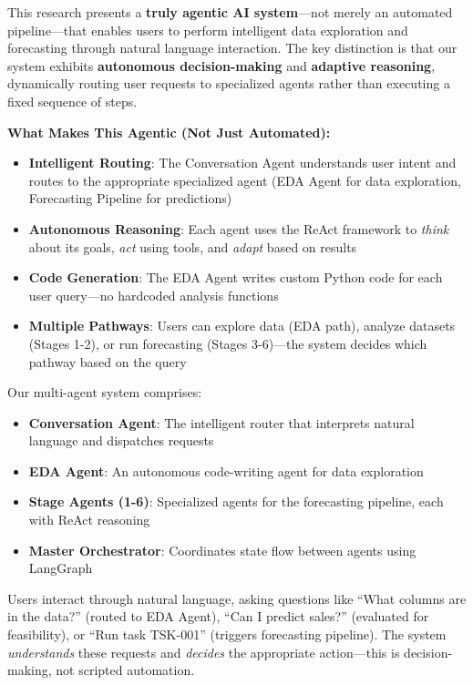\documentclass[11pt,a4paper]{article}
\begin{document}
This research presents a \textbf{truly agentic AI system}---not merely an automated pipeline---that enables users to perform intelligent data exploration and forecasting through natural language interaction. The key distinction is that our system exhibits \textbf{autonomous decision-making} and \textbf{adaptive reasoning}, dynamically routing user requests to specialized agents rather than executing a fixed sequence of steps.

\textbf{What Makes This Agentic (Not Just Automated):}
\begin{itemize}
    \item \textbf{Intelligent Routing}: The Conversation Agent understands user intent and routes to the appropriate specialized agent (EDA Agent for data exploration, Forecasting Pipeline for predictions)
    \item \textbf{Autonomous Reasoning}: Each agent uses the ReAct framework to \textit{think} about its goals, \textit{act} using tools, and \textit{adapt} based on results
    \item \textbf{Code Generation}: The EDA Agent writes custom Python code for each user query---no hardcoded analysis functions
    \item \textbf{Multiple Pathways}: Users can explore data (EDA path), analyze datasets (Stages 1-2), or run forecasting (Stages 3-6)---the system decides which pathway based on the query
\end{itemize}

Our multi-agent system comprises:
\begin{itemize}
    \item \textbf{Conversation Agent}: The intelligent router that interprets natural language and dispatches requests
    \item \textbf{EDA Agent}: An autonomous code-writing agent for data exploration
    \item \textbf{Stage Agents (1-6)}: Specialized agents for the forecasting pipeline, each with ReAct reasoning
    \item \textbf{Master Orchestrator}: Coordinates state flow between agents using LangGraph
\end{itemize}

Users interact through natural language, asking questions like ``What columns are in the data?'' (routed to EDA Agent), ``Can I predict sales?'' (evaluated for feasibility), or ``Run task TSK-001'' (triggers forecasting pipeline). The system \textit{understands} these requests and \textit{decides} the appropriate action---this is decision-making, not scripted automation.
\end{document}
